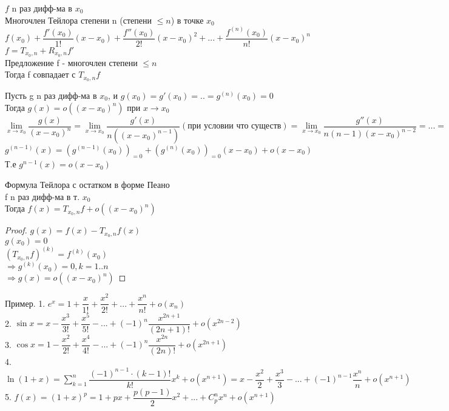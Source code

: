 
$ f $ n раз дифф-ма в $x_0$ \\
Многочлен Тейлора степени n (степени $\leq n$) в точке $x_0$ \\
$ f(x_0) + \dfrac{f'(x_0)}{1!} (x - x_0) + \dfrac{f''(x_0)}{2!} (x-x_0)^2 + ... + \dfrac{f^{(n)} (x_0)}{n!} (x-x_0)^n $ \\
$ f = T_{x_0, n} + R_{x_0, n} f' $ \\
Предложение f - многочлен степени $ \leq n$ \\
Тогда f совпадает с $ T_{x_0, n} f $ \\

\begin{lemma}
	Пусть g n раз дифф-ма в $x_0$, и $ g(x_0) = g'(x_0) = .. = g^{(n)}(x_0) = 0 $ \\
	Тогда $ g(x) = o((x - x_0)^n) $ при $ x \rightarrow x_0 $ \\
	$ \lim\limits_{x \rightarrow x_0} \dfrac{g(x)}{(x-x_0)^n} = \lim\limits_{x \rightarrow x_0} \dfrac{g'(x)}{n((x-x_0)^{n-1})} (\text{при условии что существ}) = \lim\limits_{x \rightarrow x_0} \dfrac{g''(x)}{n(n-1)(x-x_0)^{n-2}} = ... = \lim\limits_{x \rightarrow x_0} \dfrac{g^{(n-1)}(x)}{n!(x-x_0)} $ \\
	$ g^{(n-1)} (x) = (g^{(n-1)} (x_0))_{=0} + (g^{(n)} (x_0))_{=0} (x - x_0) + o(x - x_0) $ \\
	Т.е $ g^{n-1} (x) = o(x-x_0) $  
\end{lemma}

\begin{theorem}
	Формула Тейлора с остатком в форме Пеано \\
	f n раз дифф-ма в т. $ x_0 $ \\
	Тогда $ f(x) = T_{x_0, n} f + o((x-x_0)^n) $ \\
	\begin{proof}
		$ g(x) = f(x) - T_{x_0, n} f(x) $ \\
		$ g(x_0) = 0 $ \\
		$ (T_{x_0,n} f)^{(k)} = f^{(k)} (x_0) $ \\
		$ \Rightarrow g^{(k)} (x_0) = 0 , k = 1..n $\\
		$ \Rightarrow g(x) = o((x - x_0)^n) $ 
	\end{proof}
\end{theorem}

Пример. 
1. $ e^x = 1 + \dfrac{x}{1!} + \dfrac{x^2}{2!} + ... + \dfrac{x^n}{n!} + o(x_n) $ \\
2. $ \sin x = x - \dfrac{x^3}{3!} + \dfrac{x^5}{5!} - ... + (-1)^n \dfrac{x^{2n+1}}{(2n+1)!} + o(x^{2n-2}) $ \\
3. $ \cos x = 1 - \dfrac{x^2}{2!} + \dfrac{x^4}{4!} - ... + (-1)^n \dfrac{x^{2n}}{(2n)!} + o(x^{2n+1}) $ \\
4. $ \ln (1+x) = \sum_{k=1}^{n} \dfrac{(-1)^{n-1} \cdot  (k-1)!}{k!} x^k + o(x^{n+1}) = x - \dfrac{x^2}{2} + \dfrac{x^3}{3} - ...+(-1)^{n-1} \dfrac{x^n}{n} + o(x^{n+1})$ \\
5. $f(x) = (1+x)^p = 1 + px + \dfrac{p(p-1)}{2} x^2 + ... + C^n_p x^n+ o(x^{n+1}) $ \\

